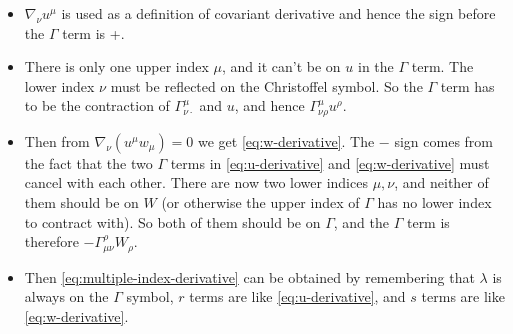 \documentclass[hyperref, a4paper]{article}
\begin{document}
\begin{itemize}
    \item $\nabla_\nu u^\mu$ is used as a definition of covariant derivative and hence the sign before the $\Gamma$ term is +. 
    \item There is only one upper index $\mu$, and it can't be on $u$ in the $\Gamma$ term. 
    The lower index $\nu$ must be reflected on the Christoffel symbol. 
    So the $\Gamma$ term has to be the contraction of $\Gamma^\mu_{\nu \cdot}$ and $u$, and hence $\Gamma^\mu_{\nu \rho} u^\rho$.
    \item Then from $\nabla_\nu (u^\mu w_\mu) = 0$ we get \eqref{eq:w-derivative}. The $-$ sign comes from the fact 
    that the two $\Gamma$ terms in \eqref{eq:u-derivative} and \eqref{eq:w-derivative} must cancel with each other.
    There are now two lower indices $\mu, \nu$, and neither of them should be on $W$ (or otherwise the upper index
    of $\Gamma$ has no lower index to contract with). So both of them should be on $\Gamma$, and the $\Gamma$ 
    term is therefore $- \Gamma_{\mu \nu}^\rho W_\rho$.
    \item Then \eqref{eq:multiple-index-derivative} can be obtained by remembering that $\lambda$ is always on the $\Gamma$ symbol, $r$ terms are like \eqref{eq:u-derivative}, and $s$ terms are like \eqref{eq:w-derivative}.
\end{itemize}
\end{document}
